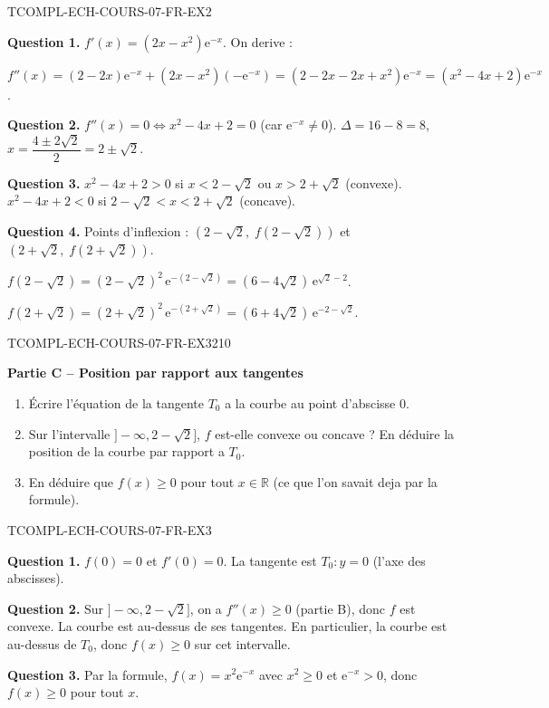 \begin{corrige}{TCOMPL-ECH-COURS-07-FR-EX2}

\textbf{Question 1.} $f'(x) = (2x - x^2)\mathrm{e}^{-x}$. On derive :

$f''(x) = (2 - 2x)\mathrm{e}^{-x} + (2x - x^2)(-\mathrm{e}^{-x}) = (2 - 2x - 2x + x^2)\mathrm{e}^{-x} = (x^2 - 4x + 2)\mathrm{e}^{-x}$.

\textbf{Question 2.} $f''(x) = 0 \iff x^2 - 4x + 2 = 0$ (car $\mathrm{e}^{-x}
\neq 0$). $\Delta = 16 - 8 = 8$, $x = \dfrac{4 \pm 2\sqrt{2}}{2} = 2 \pm \sqrt{2}$.

\textbf{Question 3.} $x^2 - 4x + 2 > 0$ si $x < 2 - \sqrt{2}$ ou $x > 2 + \sqrt{2}$ (convexe). $x^2 - 4x + 2 < 0$ si $2 - \sqrt{2} < x < 2 + \sqrt{2}$ (concave).

\textbf{Question 4.} Points d'inflexion : $(2 - \sqrt{2},\; f(2-\sqrt{2}))$ et $(2 + \sqrt{2},\; f(2+\sqrt{2}))$.

$f(2-\sqrt{2}) = (2-\sqrt{2})^2\,\mathrm{e}^{-(2-\sqrt{2})} = (6-4\sqrt{2})\,\mathrm{e}^{\sqrt{2}-2}$.

$f(2+\sqrt{2}) = (2+\sqrt{2})^2\,\mathrm{e}^{-(2+\sqrt{2})} = (6+4\sqrt{2})\,\mathrm{e}^{-2-\sqrt{2}}$.

\end{corrige}

\bigskip


\begin{exercice}{TCOMPL-ECH-COURS-07-FR-EX3}{2}{10}

\textbf{Partie C -- Position par rapport aux tangentes}

\begin{enumerate}
  \item Écrire l'équation de la tangente $T_0$ a la courbe au point d'abscisse $0$.
  \item Sur l'intervalle $]-\infty, 2 - \sqrt{2}]$, $f$ est-elle convexe ou concave ? En déduire la position de la courbe par rapport a $T_0$.
  \item En déduire que $f(x) \geq 0$ pour tout $x \in \mathbb{R}$ (ce que l'on savait deja par la formule).
\end{enumerate}

\end{exercice}

\begin{corrige}{TCOMPL-ECH-COURS-07-FR-EX3}

\textbf{Question 1.} $f(0) = 0$ et $f'(0) = 0$. La tangente est $T_0 : y = 0$ (l'axe des abscisses).

\textbf{Question 2.} Sur $]-\infty, 2 - \sqrt{2}]$, on a $f''(x) \geq 0$ (partie B), donc $f$ est convexe. La courbe est au-dessus de ses tangentes. En particulier, la courbe est au-dessus de $T_0$, donc $f(x) \geq 0$ sur cet intervalle.

\textbf{Question 3.} Par la formule, $f(x) = x^2 \mathrm{e}^{-x}$ avec $x^2 \geq 0$ et $\mathrm{e}^{-x} > 0$, donc $f(x) \geq 0$ pour tout $x$.

\end{corrige}

